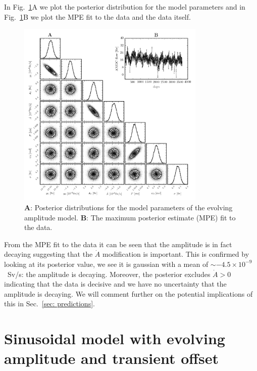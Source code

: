 \documentclass{article}
\begin{document}
In Fig.~\ref{fig: decay amplitude}A we plot the posterior distribution for the
model parameters and in Fig.~\ref{fig: decay amplitude}B we plot the MPE fit to
the data and the data itself.
\begin{figure}[htb]
\centering
\includegraphics[width=0.8\textwidth]{img/BasicSinusoidAmplitudeDecay_PosteriorWithFit}
\caption{\textbf{A}: Posterior distributions for the model parameters of the
evolving amplitude model. \textbf{B}: The maximum posterior estimate (MPE) fit
to the data.}
\label{fig: decay amplitude}
\end{figure}
From the MPE fit to the data it can be seen that the amplitude is in fact
decaying suggesting that the $\dot{A}$ modification is important. This is
confirmed by looking at its posterior value, we see it is gaussian with a mean
of $\sim-4.5\times10^{-9}$~Sv/s: the amplitude is decaying. Moreover, the
posterior excludes $\dot{A}>0$ indicating that the data is decisive and we have
no uncertainty that the amplitude is decaying. We will comment further on the
potential implications of this in Sec.~\ref{sec: predictions}.

\section{Sinusoidal model with evolving amplitude and transient offset}
\end{document}
